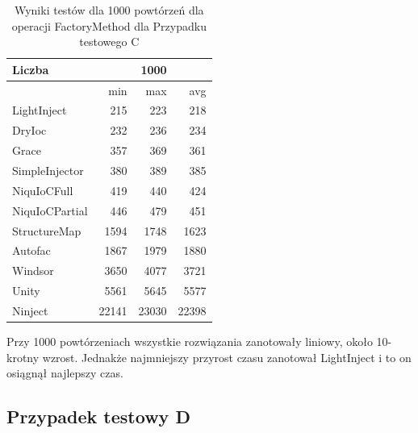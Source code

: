 \documentclass[12pt]{article}
\begin{document}
\begin{table}[H]
\captionsetup{belowskip=0pt,aboveskip=0pt}
\begin{center}
\begin{small}
	\begin{tabular}{ | l | r r r | }
    		\hline
Liczba & & 1000 & \\ \hline
 & min & max & avg \\ \hline
LightInject & 215 & 223 & 218 \\ \hline
DryIoc & 232 & 236 & 234 \\ \hline
Grace & 357 & 369 & 361 \\ \hline
SimpleInjector & 380 & 389 & 385 \\ \hline
NiquIoCFull & 419 & 440 & 424 \\ \hline
NiquIoCPartial & 446 & 479 & 451 \\ \hline
StructureMap & 1594 & 1748 & 1623 \\ \hline
Autofac & 1867 & 1979 & 1880 \\ \hline
Windsor & 3650 & 4077 & 3721 \\ \hline
Unity & 5561 & 5645 & 5577 \\ \hline
Ninject & 22141 & 23030 & 22398 \\ \hline
  	\end{tabular}
\end{small}
\end{center}
\caption{Wyniki testów dla 1000 powtórzeń dla operacji FactoryMethod dla Przypadku testowego C}
\label{TestCaseC_FactoryMethod1000}
\end{table}
Przy 1000 powtórzeniach wszystkie rozwiązania zanotowały liniowy, około 10-krotny wzrost. Jednakże najmniejszy przyrost czasu zanotował LightInject i to on osiągnął najlepszy czas.


\subsection{Przypadek testowy D}
\end{document}
